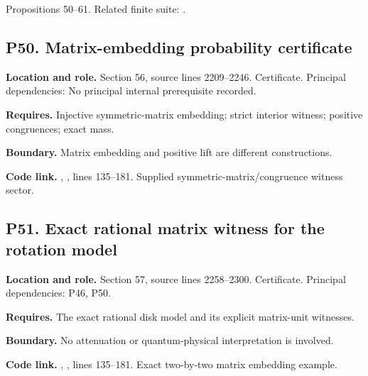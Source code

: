 \documentclass[11pt,letterpaper]{article}
\begin{document}
Propositions 50--61. Related finite suite:
.

\par\noindent\begin{minipage}{\textwidth}
\subsection{P50. Matrix-embedding probability
certificate}\label{p50.-matrix-embedding-probability-certificate}

\textbf{Location and role.} Section 56, source lines 2209--2246.
Certificate. Principal dependencies: No principal internal prerequisite
recorded.

\textbf{Requires.} Injective symmetric-matrix embedding; strict interior
witness; positive congruences; exact mass.

\textbf{Boundary.} Matrix embedding and positive lift are different
constructions.

\textbf{Code link.} ,
, lines 135--181. Supplied
symmetric-matrix/congruence witness sector.
\end{minipage}\par\medskip

\par\noindent\begin{minipage}{\textwidth}
\subsection{P51. Exact rational matrix witness for the rotation
model}\label{p51.-exact-rational-matrix-witness-for-the-rotation-model}

\textbf{Location and role.} Section 57, source lines 2258--2300.
Certificate. Principal dependencies: P46, P50.

\textbf{Requires.} The exact rational disk model and its explicit
matrix-unit witnesses.

\textbf{Boundary.} No attenuation or quantum-physical interpretation is
involved.

\textbf{Code link.} ,
, lines 135--181. Exact two-by-two matrix
embedding example.
\end{minipage}\par\medskip
\end{document}
